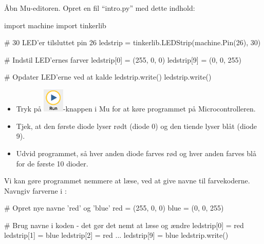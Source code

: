 \documentclass{ucph-handout}
\begin{document}
\begin{exercisebox}[adjusted title=Første MicroPython program]
Åbn Mu-editoren. Opret en fil ``intro.py'' med dette indhold:
\begin{python}
import machine
import tinkerlib

# 30 LED'er tilsluttet pin 26
ledstrip = tinkerlib.LEDStrip(machine.Pin(26), 30)

# Indstil LED'ernes farver
ledstrip[0] = (255, 0, 0)
ledstrip[9] = (0, 0, 255)

# Opdater LED'erne ved at kalde ledstrip.write()
ledstrip.write()
\end{python}

\begin{itemize}
\item Tryk på \includegraphics[width=10mm]{illustrationer/run-button}-knappen i Mu for at køre programmet på Microcontrolleren.
\item Tjek, at den første diode lyser rødt (diode 0) og den tiende lyser blåt (diode 9).
\end{itemize}

\begin{itemize}
\item Udvid programmet, så hver anden diode farves rød og hver anden farves blå for de første 10 dioder.
\end{itemize}
\end{exercisebox}
\newpage
\begin{exercisebox}[adjusted title=Navngivning]
  \vspace{-1mm}
  Vi kan gøre programmet nemmere at læse, ved at give navne til
  farvekoderne. Navngiv farverne i :
 \vspace{-1mm}
\begin{python}
# Opret nye navne 'red' og 'blue'
red = (255, 0, 0)
blue = (0, 0, 255)

# Brug navne i koden - det gør det nemt at læse og ændre
ledstrip[0] = red
ledstrip[1] = blue
ledstrip[2] = red
...
ledstrip[9] = blue
ledstrip.write()
\end{python}
\vspace{-4mm}
\end{exercisebox}
\end{document}
